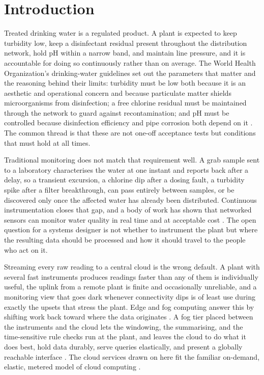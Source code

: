 \documentclass[conference]{IEEEtran}
\begin{document}
\section{Introduction}

Treated drinking water is a regulated product. A plant is expected to keep turbidity low, keep a disinfectant residual present throughout the distribution network, hold pH within a narrow band, and maintain line pressure, and it is accountable for doing so continuously rather than on average. The World Health Organization's drinking-water guidelines set out the parameters that matter and the reasoning behind their limits: turbidity must be low both because it is an aesthetic and operational concern and because particulate matter shields microorganisms from disinfection; a free chlorine residual must be maintained through the network to guard against recontamination; and pH must be controlled because disinfection efficiency and pipe corrosion both depend on it \cite{who2017}. The common thread is that these are not one-off acceptance tests but conditions that must hold at all times.

Traditional monitoring does not match that requirement well. A grab sample sent to a laboratory characterises the water at one instant and reports back after a delay, so a transient excursion, a chlorine dip after a dosing fault, a turbidity spike after a filter breakthrough, can pass entirely between samples, or be discovered only once the affected water has already been distributed. Continuous instrumentation closes that gap, and a body of work has shown that networked sensors can monitor water quality in real time and at acceptable cost \cite{vijayakumar2015, geetha2018}. The open question for a systems designer is not whether to instrument the plant but where the resulting data should be processed and how it should travel to the people who act on it.

Streaming every raw reading to a central cloud is the wrong default. A plant with several fast instruments produces readings faster than any of them is individually useful, the uplink from a remote plant is finite and occasionally unreliable, and a monitoring view that goes dark whenever connectivity dips is of least use during exactly the upsets that stress the plant. Edge and fog computing answer this by shifting work back toward where the data originates \cite{shi2016}. A fog tier placed between the instruments and the cloud lets the windowing, the summarising, and the time-sensitive rule checks run at the plant, and leaves the cloud to do what it does best, hold data durably, serve queries elastically, and present a globally reachable interface \cite{bonomi2012, naha2018}. The cloud services drawn on here fit the familiar on-demand, elastic, metered model of cloud computing \cite{mell2011}.
\end{document}
